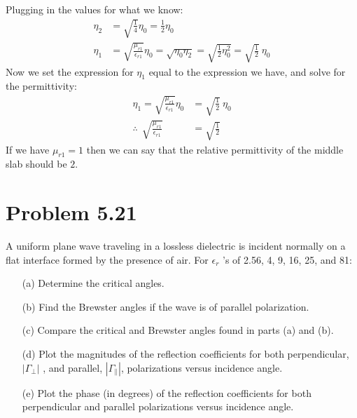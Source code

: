 \documentclass[12pt]{article}
\begin{document}
Plugging in the values for what we know:
\begin{align*}
  \eta_2 &= \sqrt{\frac{1}{4}}\eta_0 = \frac{1}{2}\eta_0\\
  \eta_1 &= \sqrt{\frac{\mu_{r1}}{\epsilon_{r1}}}\eta_0 = \sqrt{\eta_0\eta_2} = \sqrt{\frac{1}{2}\eta_0^2} = \sqrt{\frac{1}{2}}\ \eta_0
\end{align*}
Now we set the expression for $\eta_1$ equal to the expression we have, and solve for the permittivity:
\begin{align*}
  \eta_1 = \sqrt{\frac{\mu_{r1}}{\epsilon_{r1}}}\eta_0 &= \sqrt{\frac{1}{2}}\ \eta_0\\
  \therefore\ \ \sqrt{\frac{\mu_{r1}}{\epsilon_{r1}}} &= \sqrt{\frac{1}{2}}
\end{align*}
If we have $\mu_{r1} = 1$ then we can say that the relative permittivity of the middle slab should be $2$.
\section*{Problem 5.21}
A uniform plane wave traveling in a lossless dielectric is incident normally on a flat interface formed by the presence of air. For $\epsilon_r$ ’s of 2.56, 4, 9, 16, 25, and 81:
\begin{itemize}
\item[(a)] Determine the critical angles.
\item[(b)] Find the Brewster angles if the wave is of parallel polarization.
\item[(c)] Compare the critical and Brewster angles found in parts (a) and (b).
\item[(d)] Plot the magnitudes of the reflection coefficients for both perpendicular, $|\Gamma_{\perp}|$ , and parallel, $|\Gamma_{\parallel}|$, polarizations versus incidence angle.
\item[(e)] Plot the phase (in degrees) of the reflection coefficients for both perpendicular
and parallel polarizations versus incidence angle.
\end{itemize}



\end{document}
